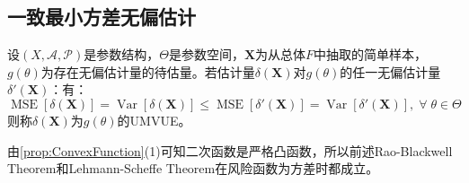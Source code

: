 \subsection{一致最小方差无偏估计}
\begin{definition}
	设$(X,\mathscr{A},\mathscr{P})$是参数结构，$\Theta$是参数空间，$\mathbf{X}$为从总体$F$中抽取的简单样本，$g(\theta)$为存在无偏估计量的待估量。若估计量$\delta(\mathbf{X})$对$g(\theta)$的任一无偏估计量$\delta'(\mathbf{X})$：有：
	\begin{equation*}
		\operatorname{MSE}[\delta(\mathbf{X})]=\operatorname{Var}[\delta(\mathbf{X})]\leqslant\operatorname{MSE}[\delta'(\mathbf{X})]=\operatorname{Var}[\delta'(\mathbf{X})],\;\forall\;\theta\in\Theta
	\end{equation*}
	则称$\delta(\mathbf{X})$为$g(\theta)$的\gls{UMVUE}。
\end{definition}
\begin{note}
	由\cref{prop:ConvexFunction}(1)可知二次函数是严格凸函数，所以前述Rao-Blackwell Theorem和Lehmann-Scheffe Theorem在风险函数为方差时都成立。
\end{note}
